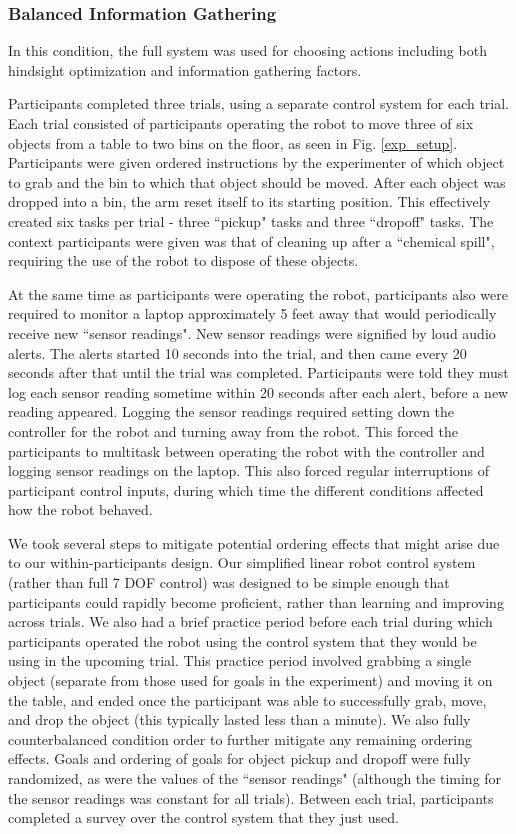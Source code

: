 \documentclass[conference]{IEEEtran}
\begin{document}
\subsubsection{Balanced Information Gathering}
In this condition, the full system was used for choosing actions including both hindsight optimization and information gathering factors.

Participants completed three trials, using a separate control system for each trial. Each trial consisted of participants operating the robot to move three of six objects from a table to two bins on the floor, as seen in Fig. \ref{exp_setup}. Participants were given ordered instructions by the experimenter of which object to grab and the bin to which that object should be moved. After each object was dropped into a bin, the arm reset itself to its starting position. This effectively created six tasks per trial - three ``pickup" tasks and three ``dropoff" tasks. The context participants were given was that of cleaning up after a ``chemical spill", requiring the use of the robot to dispose of these objects.

At the same time as participants were operating the robot, participants also were required to monitor a laptop approximately 5 feet away that would periodically receive new ``sensor readings". New sensor readings were signified by loud audio alerts. The alerts started 10 seconds into the trial, and then came every 20 seconds after that until the trial was completed. Participants were told they must log each sensor reading sometime within 20 seconds after each alert, before a new reading appeared. Logging the sensor readings required setting down the controller for the robot and turning away from the robot. This forced the participants to multitask between operating the robot with the controller and logging sensor readings on the laptop. This also forced regular interruptions of participant control inputs, during which time the different conditions affected how the robot behaved.

We took several steps to mitigate potential ordering effects that might arise due to our within-participants design. Our simplified linear robot control system (rather than full 7 DOF control) was designed to be simple enough that participants could rapidly become proficient, rather than learning and improving across trials. We also had a brief practice period before each trial during which participants operated the robot using the control system that they would be using in the upcoming trial. This practice period involved grabbing a single object (separate from those used for goals in the experiment) and moving it on the table, and ended once the participant was able to successfully grab, move, and drop the object (this typically lasted less than a minute). We also fully counterbalanced condition order to further mitigate any remaining ordering effects. Goals and ordering of goals for object pickup and dropoff were fully randomized, as were the values of the ``sensor readings" (although the timing for the sensor readings was constant for all trials). Between each trial, participants completed a survey over the control system that they just used.
\end{document}
